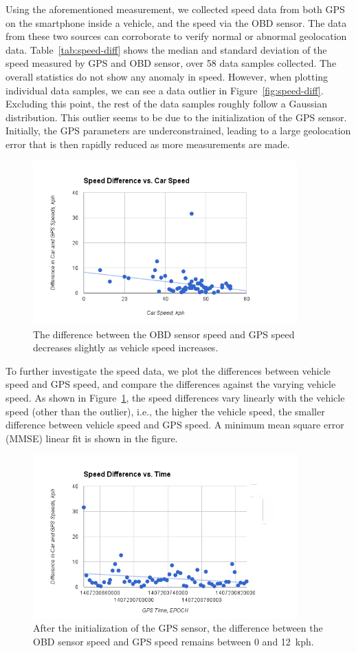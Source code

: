 Using the aforementioned measurement, we collected speed data from both GPS 
on the smartphone inside a vehicle, and the speed via the OBD sensor. 
The data from these two sources can corroborate to verify normal or abnormal 
geolocation data. Table~\ref{tab:speed-diff} shows the median and standard deviation
of the speed measured by GPS and OBD sensor, over 58 data samples collected. 
The overall statistics do not show any anomaly in speed. However, when plotting 
individual data samples, we can see a data outlier in Figure~\ref{fig:speed-diff}. 
Excluding this point, the rest of the data samples roughly follow a Gaussian 
distribution. This outlier seems to be due to the initialization of the
GPS sensor.  Initially, the GPS parameters are underconstrained, leading to a large 
geolocation error that is then rapidly reduced as more measurements are made.


\begin{figure}
\centering
\includegraphics[width=4in]{car.png}
\caption{The difference between the OBD sensor speed and GPS speed decreases slightly as vehicle speed increases.}
\label{fig:car}
\end{figure}

To further investigate the speed data, we plot the differences between 
vehicle speed and GPS speed, and compare the differences against 
the varying vehicle speed. As shown in Figure~\ref{fig:car}, the speed 
differences vary linearly with the vehicle speed 
(other than the outlier), i.e., the 
higher the vehicle speed, the smaller difference between vehicle 
speed and GPS speed. 
A minimum mean square error (MMSE) linear fit is shown in the figure.

\begin{figure}
\centering
\includegraphics[width=4in]{time.png}
\caption{After the initialization of the GPS sensor, the difference between the  OBD sensor speed and GPS speed remains between 0 and 12~kph.}
\label{fig:time}
\end{figure}

